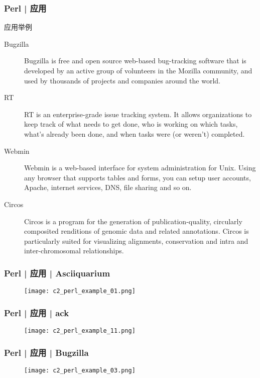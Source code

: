 \begin{frame}
  \frametitle{Perl | 应用}
  {\footnotesize
    \begin{block}{应用举例}
    \begin{description}
      \item[\alert{Bugzilla}] Bugzilla is free and open source web-based bug-tracking software that is developed by an active group of volunteers in the Mozilla community, and used by thousands of projects and companies around the world. 
      \item[RT] RT is an enterprise-grade issue tracking system. It allows organizations to keep track of what needs to get done, who is working on which tasks, what's already been done, and when tasks were (or weren't) completed.
      \item[\alert{Webmin}] Webmin is a web-based interface for system administration for Unix. Using any browser that supports tables and forms, you can setup user accounts, Apache, internet services, DNS, file sharing and so on.
      \item[\alert{Circos}] Circos is a program for the generation of publication-quality, circularly composited renditions of genomic data and related annotations. Circos is particularly suited for visualizing alignments, conservation and intra and inter-chromosomal relationships.
    \end{description}
  \end{block}
  }
\end{frame}

\begin{frame}
  \frametitle{Perl | 应用 | Asciiquarium}
  \begin{figure}
    \centering
    \texttt{[image: c2\_perl\_example\_01.png]}
  \end{figure}
\end{frame}

\begin{frame}
  \frametitle{Perl | 应用 | ack}
  \begin{figure}
    \centering
    \texttt{[image: c2\_perl\_example\_11.png]}
  \end{figure}
\end{frame}

\begin{frame}
  \frametitle{Perl | 应用 | Bugzilla}
  \begin{figure}
    \centering
    \texttt{[image: c2\_perl\_example\_03.png]}
  \end{figure}
\end{frame}

